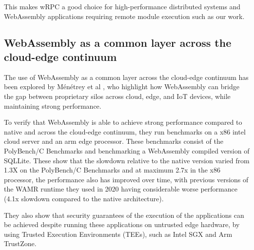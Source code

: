 This makes wRPC a good choice for high-performance distributed systems and WebAssembly applications requiring remote module execution such as our work.

\subsection{WebAssembly as a common layer across the cloud-edge continuum}

The use of WebAssembly as a common layer across the cloud-edge continuum has been explored by
Ménétrey et al \cite{menetrey2022webassembly}, who highlight how WebAssembly can bridge the gap between proprietary silos across
cloud, edge, and IoT devices, while maintaining strong performance. 

To verify that WebAssembly is
able to achieve strong performance compared to native and across the cloud-edge continuum, they run
benchmarks on a x86 intel cloud server and an arm edge processor. These benchmarks consist of
the PolyBench/C Benchmarks and benchmarking a WebAssembly compiled version of SQLLite.
These show that the slowdown relative to the native version varied from 1.3X on the PolyBench/C Benchmarks
and at maximum 2.7x in the x86 processor, the performance also has improved over time, with previous
versions of the WAMR runtime they used in 2020 having considerable worse performance (4.1x slowdown
compared to the native architecture). 

They also show that security guarantees of the execution of the applications can be achieved despite running these applications on untrusted edge hardware, by using
Trusted Execution Environments (TEEs), such as Intel SGX and Arm TrustZone.


